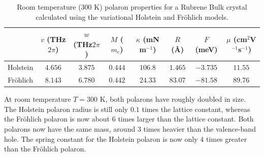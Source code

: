 \begin{table}
    \centering
    \begin{tabular}{|c|c|c|c|c|c|c|c|}
    \hline
        & $v$ (THz$2\pi$) & $w$ (THz$2\pi$) & $M$ ($m_e$) &  $\kappa$ (mN m$^{-1}$) & $R$ (Å) & $F$ (meV) & $\mu$ (cm$^2$V$^{-1}$s$^{-1}$) \\
    \hline
         Holstein & $4.656$ & $3.875$ & $0.444$ & $106.8$ & $1.465$ & $-3.735$ & $11.55$ \\
    \hline
        Fr\"ohlich & $8.143$ & $6.780$ & $0.442$ & $24.33$ & $83.07$ & $-81.58$ & $89.76$ \\
    \hline
    \end{tabular}
    \caption{Room temperature ($300$ K) polaron properties for a Rubrene Bulk crystal calculated using the variational Holstein and Fr\"ohlich models.}
    \label{tab:rubrenert}
\end{table}

At room temperature $T = 300$ K, both polarons have roughly doubled in size. The Holstein polaron radius is still only $0.1$ times the lattice constant, whereas the Fr\"ohlich polaron is now about $6$ times larger than the lattice constant. Both polarons now have the same mass, around $3$ times heavier than the valence-band hole. The spring constant for the Holstein polaron is now only $4$ times greater than the Fr\"ohlich polaron.

